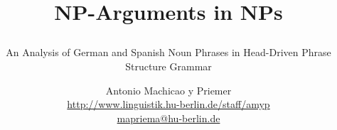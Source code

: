 

\title{\begin{Huge}NP-Arguments in NPs\end{Huge}}

\subtitle{An Analysis of German and Spanish Noun Phrases in Head-Driven Phrase Structure Grammar}


\dedication{For NN}

\author{Antonio Machicao y Priemer\\
	\url{http://www.linguistik.hu-berlin.de/staff/amyp}\\
	\href{mailto:mapriema@hu-berlin.de}{mapriema@hu-berlin.de}}




\publishers{Humboldt-Universität zu Berlin}


